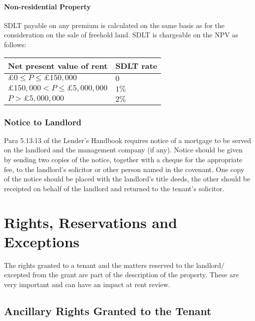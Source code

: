 \documentclass[
]{article}
\begin{document}
\hypertarget{non-residential-property}{%
\paragraph{Non-residential Property}\label{non-residential-property}}

SDLT payable on any premium is calculated on the same basis as for the
consideration on the sale of freehold land. SDLT is chargeable on the
NPV as follows:

\begin{longtable}[]{@{}ll@{}}
\toprule()
Net present value of rent & SDLT rate \\
\midrule()
\endhead
{\(\pounds 0 \leq P \leq \pounds 150,000\)} & {\(0\)} \\
{\(\pounds 150,000 < P \leq \pounds 5,000,000\)} & {\(1\%\)} \\
{\(P > \pounds 5,000,000\)} & {\(2\%\)} \\
\bottomrule()
\end{longtable}

\hypertarget{notice-to-landlord}{%
\subsubsection{Notice to Landlord}\label{notice-to-landlord}}

Para 5.13.13 of the Lender's Handbook requires notice of a mortgage to
be served on the landlord and the management company (if any). Notice
should be given by sending two copies of the notice, together with a
cheque for the appropriate fee, to the landlord's solicitor or other
person named in the covenant. One copy of the notice should be placed
with the landlord's title deeds, the other should be receipted on behalf
of the landlord and returned to the tenant's solicitor.

\hypertarget{rights-reservations-and-exceptions}{%
\section{Rights, Reservations and
Exceptions}\label{rights-reservations-and-exceptions}}

The rights granted to a tenant and the matters reserved to the landlord/
excepted from the grant are part of the description of the property.
These are very important and can have an impact at rent review.

\hypertarget{ancillary-rights-granted-to-the-tenant}{%
\subsection{Ancillary Rights Granted to the
Tenant}\label{ancillary-rights-granted-to-the-tenant}}
\end{document}

